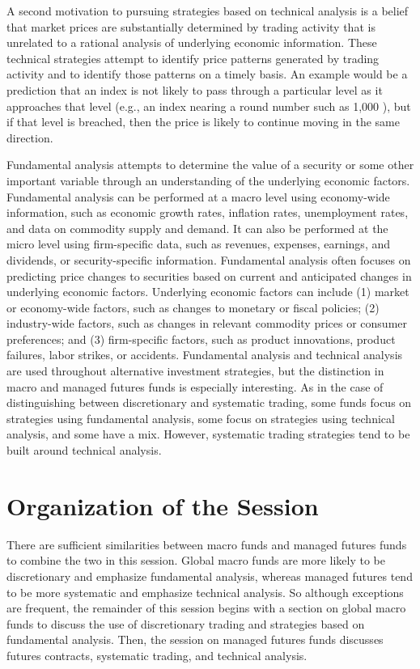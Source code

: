 \documentclass[11pt]{article}
\begin{document}
A second motivation to pursuing strategies based on technical analysis is a belief that market prices are substantially determined by trading activity that is unrelated to a rational analysis of underlying economic information. These technical strategies attempt to identify price patterns generated by trading activity and to identify those patterns on a timely basis. An example would be a prediction that an index is not likely to pass through a particular level as it approaches that level (e.g., an index nearing a round number such as 1,000 ), but if that level is breached, then the price is likely to continue moving in the same direction.

Fundamental analysis attempts to determine the value of a security or some other important variable through an understanding of the underlying economic factors. Fundamental analysis can be performed at a macro level using economy-wide information, such as economic growth rates, inflation rates, unemployment rates, and data on commodity supply and demand. It can also be performed at the micro level using firm-specific data, such as revenues, expenses, earnings, and dividends, or security-specific information. Fundamental analysis often focuses on predicting price changes to securities based on current and anticipated changes in underlying economic factors. Underlying economic factors can include (1) market or economy-wide factors, such as changes to monetary or fiscal policies; (2) industry-wide factors, such as changes in relevant commodity prices or consumer preferences; and (3) firm-specific factors, such as product innovations, product failures, labor strikes, or accidents. Fundamental analysis and technical analysis are used throughout alternative investment strategies, but the distinction in macro and managed futures funds is especially interesting. As in the case of distinguishing between discretionary and systematic trading, some funds focus on strategies using fundamental analysis, some focus on strategies using technical analysis, and some have a mix. However, systematic trading strategies tend to be built around technical analysis.

\section*{Organization of the Session}
There are sufficient similarities between macro funds and managed futures funds to combine the two in this session. Global macro funds are more likely to be discretionary and emphasize fundamental analysis, whereas managed futures tend to be more systematic and emphasize technical analysis. So although exceptions are frequent, the remainder of this session begins with a section on global macro funds to discuss the use of discretionary trading and strategies based on fundamental analysis. Then, the session on managed futures funds discusses futures contracts, systematic trading, and technical analysis.
\end{document}
